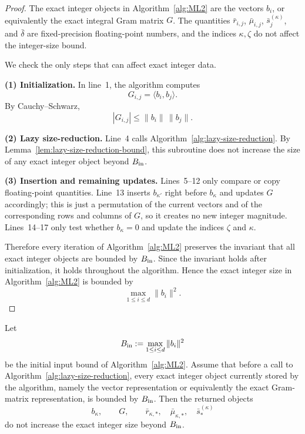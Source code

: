 \begin{proof}
The exact integer objects in Algorithm~\ref{alg:ML2} are the vectors $b_i$, or
equivalently the exact integral Gram matrix $G$. The quantities
$\bar r_{i,j}$, $\bar\mu_{i,j}$, $\bar s^{(\kappa)}_j$, and $\bar\delta$ are
fixed-precision floating-point numbers, and the indices $\kappa,\zeta$ do not
affect the integer-size bound.

We check the only steps that can affect exact integer data.

\smallskip
\noindent\textbf{(1) Initialization.}
In line~1, the algorithm computes
\[
  G_{i,j}=\langle b_i,b_j\rangle .
\]
By Cauchy--Schwarz,
\[
  |G_{i,j}|
  \le \|b_i\|\,\|b_j\|.
\]

\smallskip
\noindent\textbf{(2) Lazy size-reduction.}
Line~4 calls Algorithm~\ref{alg:lazy-size-reduction}. By
Lemma~\ref{lem:lazy-size-reduction-bound}, this subroutine does not increase
the size of any exact integer object beyond $B_{\rm in}$.

\smallskip
\noindent\textbf{(3) Insertion and remaining updates.}
Lines~5--12 only compare or copy floating-point quantities. Line~13 inserts
$b_{\kappa'}$ right before $b_\kappa$ and updates $G$ accordingly; this is just
a permutation of the current vectors and of the corresponding rows and columns
of $G$, so it creates no new integer magnitude. Lines~14--17 only test whether
$b_\kappa=0$ and update the indices $\zeta$ and $\kappa$.

Therefore every iteration of Algorithm~\ref{alg:ML2} preserves the invariant
that all exact integer objects are bounded by $B_{\rm in}$. Since the invariant
holds after initialization, it holds throughout the algorithm. Hence the exact
integer size in Algorithm~\ref{alg:ML2} is bounded by
\[
  \boxed{
  \max_{1\le i\le d}\|b_i\|^2
  } .
\]
\end{proof}

\begin{lemma}
\label{lem:lazy-size-reduction-bound}
Let
\[
  B_{\rm in}:=\max_{1\le i\le d}\|b_i\|^2
\]
be the initial input bound of Algorithm~\ref{alg:ML2}. Assume that before a
call to Algorithm~\ref{alg:lazy-size-reduction}, every exact integer object
currently stored by the algorithm, namely the vector representation or
equivalently the exact Gram-matrix representation, is bounded by $B_{\rm in}$.
Then the returned objects
\[
  b_\kappa,\qquad G,\qquad
  \bar r_{\kappa,*},\quad \bar\mu_{\kappa,*},\quad
  \bar s^{(\kappa)}_*
\]
do not increase the exact integer size beyond $B_{\rm in}$.
\end{lemma}

